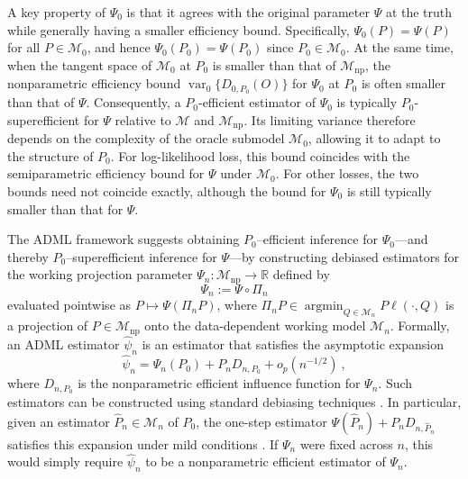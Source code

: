 \documentclass[11pt]{article}
\DeclareMathOperator*{\argmin}{argmin}
\theoremstyle{definition}
\begin{document}
 

A key property of \(\Psi_0\) is that it agrees with the original parameter \(\Psi\) at the truth while generally having a smaller efficiency bound. Specifically, \(\Psi_0(P)=\Psi(P)\) for all \(P \in \mathcal{M}_0\), and hence \(\Psi_0(P_0)=\Psi(P_0)\) since \(P_0 \in \mathcal{M}_0\). At the same time, when the tangent space of \(\mathcal{M}_0\) at \(P_0\) is smaller than that of \(\mathcal{M}_{\mathrm{np}}\), the nonparametric efficiency bound \(\operatorname{var}_0\{D_{0,P_0}(O)\}\) for \(\Psi_0\) at \(P_0\) is often smaller than that of \(\Psi\). Consequently, a \(P_0\)-efficient estimator of \(\Psi_0\) is typically \(P_0\)-superefficient for \(\Psi\) relative to \(\mathcal{M}\) and \(\mathcal{M}_{\mathrm{np}}\). Its limiting variance therefore depends on the complexity of the oracle submodel \(\mathcal{M}_0\), allowing it to adapt to the structure of \(P_0\). For log-likelihood loss, this bound coincides with the semiparametric efficiency bound for \(\Psi\) under \(\mathcal{M}_0\). For other losses, the two bounds need not coincide exactly, although the bound for \(\Psi_0\) is still typically smaller than that for \(\Psi\).


 

The ADML framework suggests obtaining $P_0$--efficient inference for $\Psi_0$---and thereby $P_0$--superefficient inference for $\Psi$---by constructing debiased estimators for the working projection parameter $\Psi_n: \mathcal{M}_{\mathrm{np}} \rightarrow \mathbb{R}$ defined by
\begin{equation}
   \Psi_n:= \Psi \circ \Pi_n
   \label{eqn::dataadaptParam}
\end{equation}
evaluated pointwise as $P\mapsto \Psi(\Pi_n P)$,
where $\Pi_n P \in \argmin_{Q \in \mathcal{M}_n} P \ell(\cdot, Q)$ is a projection of $P \in \mathcal{M}_{\mathrm{np}}$ onto the data-dependent working model $\mathcal{M}_n$. Formally, an ADML estimator \(\widehat{\psi}_n\) is an estimator that satisfies the asymptotic expansion
\[
\widehat{\psi}_n = \Psi_n(P_0) + P_n D_{n,P_0} + o_p(n^{-1/2})\ ,
\]
where \(D_{n,P_0}\) is the nonparametric efficient influence function for \(\Psi_n\). Such estimators can be constructed using standard debiasing techniques \citep{dataAdaptTargetParam}. In particular, given an estimator \(\widehat{P}_n \in \mathcal{M}_n\) of \(P_0\), the one-step estimator \(\Psi(\widehat{P}_n) + P_n D_{n,\widehat{P}_n}\) satisfies this expansion under mild conditions \citep{bickel1993efficient}. If \(\Psi_n\) were fixed across \(n\), this would simply require \(\widehat{\psi}_n\) to be a nonparametric efficient estimator of \(\Psi_n\).
\end{document}
